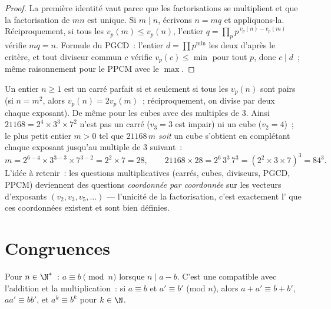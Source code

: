 \begin{proof}
La première identité vaut parce que les factorisations se multiplient et que
la factorisation de $mn$ est unique. Si $m \mid n$, écrivons $n = mq$ et
appliquons-la. Réciproquement, si tous les $v_p(m) \leq v_p(n)$, l'entier $q =
\prod_p p^{\,v_p(n) - v_p(m)}$ vérifie $mq = n$. Formule du PGCD~:
l'entier $d = \prod p^{\min}$  les deux d'après le critère, et
tout diviseur commun $c$ vérifie $v_p(c) \leq \min$ pour tout $p$, donc $c
\mid d$~; même raisonnement pour le PPCM avec le $\max$.
\end{proof}

\begin{example}\label{ex:b1:arith:squarecube}
Un entier $n \geq 1$ est un carré parfait si et seulement si tous les
$v_p(n)$ sont pairs (si $n = m^2$, alors $v_p(n) = 2v_p(m)$~;
réciproquement, on divise par deux chaque exposant). De même pour les cubes avec des
multiples de $3$. Ainsi $21168 = 2^4 \times 3^3 \times 7^2$ n'est pas
un carré ($v_3 = 3$ est impair) ni un cube ($v_2 = 4$)~; le
plus petit entier $m > 0$ tel que $21168\,m$ \emph{soit} un
cube s'obtient en complétant chaque exposant jusqu'au multiple de $3$
suivant~:
\[
m = 2^{6-4} \times 3^{3-3} \times 7^{3-2} = 2^2 \times 7 = 28,
\qquad
21168 \times 28 = 2^6\,3^3\,7^3 = (2^2 \times 3 \times 7)^3
= 84^3 .
\]
L'idée à retenir~: les questions multiplicatives (carrés, cubes,
diviseurs, PGCD, PPCM) deviennent des questions \emph{coordonnée par
coordonnée} sur les vecteurs d'exposants $(v_2, v_3, v_5, \dots)$ ---
l'unicité de la factorisation, c'est exactement l' que ces
coordonnées existent et sont bien définies.
\end{example}

\section{Congruences}

\begin{definition}\label{def:b1:arith:congruence}
Pour $n \in \N^*$~: $a \equiv b \pmod n$ lorsque $n \mid
a - b$. C'est une  compatible avec l'addition et
la multiplication~: si $a \equiv b$ et $a' \equiv b'$ (mod $n$), alors
$a + a' \equiv b + b'$, $aa' \equiv bb'$, et $a^k \equiv b^k$ pour
$k \in \N$.
\end{definition}

